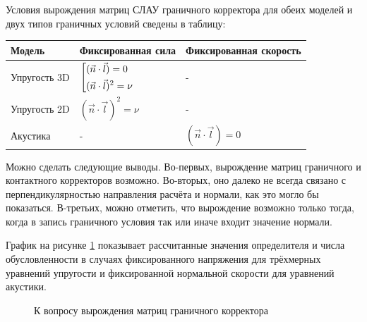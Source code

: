 Условия вырождения матриц СЛАУ граничного корректора для обеих моделей и 
двух типов граничных условий сведены в таблицу:
\begin{center}
\label{degeneracy_table}
    \begin{tabular}{ | l | l | l | }
    \hline
    Модель & Фиксированная сила & Фиксированная скорость \\ \hline
    Упругость 3D & $\left[ \begin{gathered} (\vec{n} \cdot \vec{l}) = 0  \hfill \\ (\vec{n} \cdot \vec{l})^2 = \nu \hfill \\ \end{gathered} \right.$
 & - \\ \hline
    Упругость 2D & $(\vec{n} \cdot \vec{l})^2 = \nu$ & -  \\ \hline
    Акустика & - & $(\vec{n} \cdot \vec{l}) = 0$     \\ \hline
    \end{tabular}
\end{center}

Можно сделать следующие выводы. 
Во-первых, вырождение матриц граничного и контактного корректоров возможно. 
Во-вторых, оно далеко не всегда связано с перпендикулярностью направления 
расчёта и нормали, как это могло бы показаться. 
В-третьих, можно отметить, что вырождение возможно только тогда, 
когда в запись граничного условия так или иначе входит значение нормали.

График на рисунке \ref{pic:corrector_conditional} показывает рассчитанные 
значения определителя и числа обусловленности в случаях 
фиксированного напряжения для трёхмерных уравнений упругости и 
фиксированной нормальной скорости для уравнений акустики. 
\begin{figure}[H]
	\caption{К вопросу вырождения матриц граничного корректора}
	\label{pic:corrector_conditional}
\end{figure}

